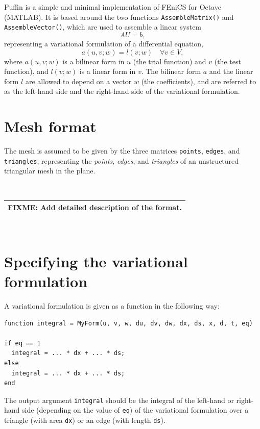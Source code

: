 \documentclass[12pt]{article}
\newcommand{\fixme}[1]{\ \\ \begin{tabular}{|c|}\hline \rm \textbf{FIXME:} \rm  #1  \\ \hline \end{tabular} \\}
\begin{document}
Puffin is a simple and minimal implementation of FEniCS for Octave (MATLAB).
It is based around the two functions \texttt{AssembleMatrix()} and \texttt{AssembleVector()},
which are used to assemble a linear system
\begin{equation}
  AU = b,
\end{equation}
representing a variational formulation of a differential equation,
\begin{equation}
  a(u,v;w) = l(v;w) \quad \forall v \in V,
\end{equation}
where $a(u,v;w)$ is a bilinear form in $u$ (the trial function) and $v$ (the test function),
and $l(v;w)$ is a linear form in $v$. The bilinear form $a$ and the linear form $l$ are allowed
to depend on a vector $w$ (the coefficients), and are referred to as the left-hand side and
the right-hand side of the variational formulation.

\cleardoublepage
\section{Mesh format}

The mesh is assumed to be given by the three matrices
\texttt{points}, \texttt{edges}, and \texttt{triangles}, representing the
\emph{points}, \emph{edges}, and \emph{triangles} of an unstructured
triangular mesh in the plane.

\fixme{Add detailed description of the format.}

\cleardoublepage
\section{Specifying the variational formulation}

A variational formulation is given as a function in the following way:

\begin{verbatim}
function integral = MyForm(u, v, w, du, dv, dw, dx, ds, x, d, t, eq)

if eq == 1
  integral = ... * dx + ... * ds;
else
  integral = ... * dx + ... * ds;
end
\end{verbatim}

The output argument \texttt{integral} should be the integral of the left-hand or right-hand side
(depending on the value of \texttt{eq}) of the variational formulation over a triangle (with 
area \texttt{dx}) or an edge (with length \texttt{ds}).
\end{document}
